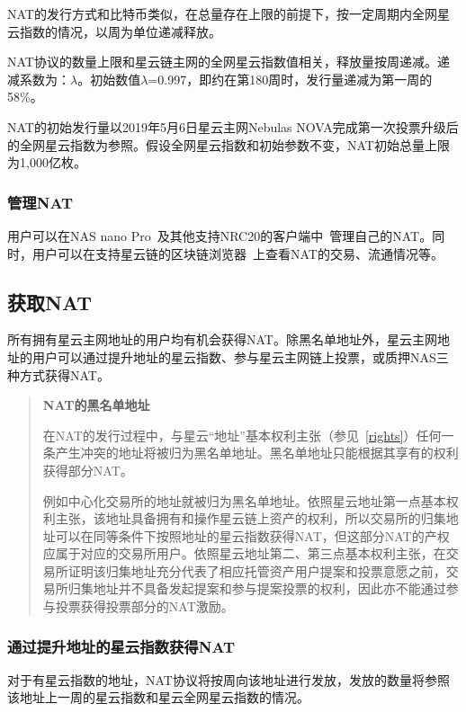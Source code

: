 NAT的发行方式和比特币类似，在总量存在上限的前提下，按一定周期内全网星云指数的情况，以周为单位递减释放。

NAT协议的数量上限和星云链主网的全网星云指数值相关，释放量按周递减。递减系数为：$\lambda$。初始数值$\lambda$=0.997，即约在第180周时，发行量递减为第一周的58\%。

NAT的初始发行量以2019年5月6日星云主网Nebulas NOVA完成第一次投票升级后的全网星云指数为参照。假设全网星云指数和初始参数不变，NAT初始总量上限为1,000亿枚。

\subsubsection{管理NAT}

用户可以在NAS nano Pro~\cite{NASnano}及其他支持NRC20的客户端中~\cite{wallets}管理自己的NAT。同时，用户可以在支持星云链的区块链浏览器~\cite{explorer}上查看NAT的交易、流通情况等。

\subsection{获取NAT}

所有拥有星云主网地址的用户均有机会获得NAT。除黑名单地址外，星云主网地址的用户可以通过提升地址的星云指数、参与星云主网链上投票，或质押NAS三种方式获得NAT。

\begin{quotation}

\textbf{NAT的黑名单地址}

在NAT的发行过程中，与星云“地址”基本权利主张（参见~\ref{rights}）任何一条产生冲突的地址将被归为黑名单地址。黑名单地址只能根据其享有的权利获得部分NAT。

例如中心化交易所的地址就被归为黑名单地址。依照星云地址第一点基本权利主张，该地址具备拥有和操作星云链上资产的权利，所以交易所的归集地址可以在同等条件下按照地址的星云指数获得NAT，但这部分NAT的产权应属于对应的交易所用户。依照星云地址第二、第三点基本权利主张，在交易所证明该归集地址充分代表了相应托管资产用户提案和投票意愿之前，交易所归集地址并不具备发起提案和参与提案投票的权利，因此亦不能通过参与投票获得投票部分的NAT激励。

\end{quotation}

\subsubsection{通过提升地址的星云指数获得NAT}

对于有星云指数的地址，NAT协议将按周向该地址进行发放，发放的数量将参照该地址上一周的星云指数和星云全网星云指数的情况。

